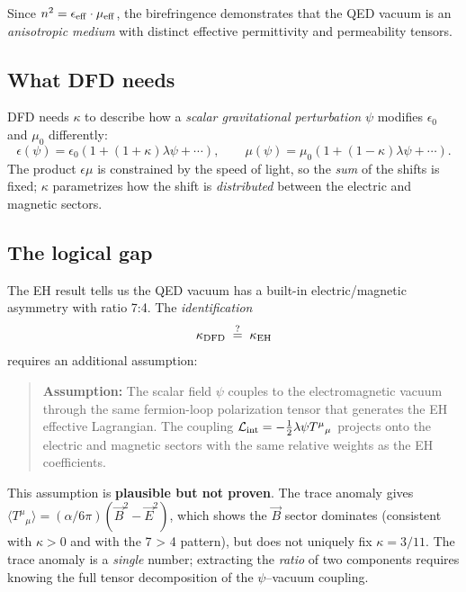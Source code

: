 \documentclass[12pt]{article}
\newcommand{\vE}{\vec{E}}
\newcommand{\vB}{\vec{B}}
\begin{document}
Since $n^2 = \epsilon_{\rm eff} \cdot \mu_{\rm eff}$, the
birefringence demonstrates that the QED vacuum is an
\emph{anisotropic medium} with distinct effective permittivity and
permeability tensors.

\subsection{What DFD needs}

DFD needs $\kappa$ to describe how a \emph{scalar gravitational
perturbation} $\psi$ modifies $\epsilon_0$ and $\mu_0$ differently:
\begin{equation}
\epsilon(\psi) = \epsilon_0(1 + (1+\kappa)\lambda\psi + \cdots),
\qquad
\mu(\psi) = \mu_0(1 + (1-\kappa)\lambda\psi + \cdots).
\end{equation}
The product $\epsilon\mu$ is constrained by the speed of light, so
the \emph{sum} of the shifts is fixed; $\kappa$ parametrizes how the
shift is \emph{distributed} between the electric and magnetic
sectors.

\subsection{The logical gap}

The EH result tells us the QED vacuum has a built-in
electric/magnetic asymmetry with ratio 7:4.  The \emph{identification}
\begin{equation}
\kappa_{\rm DFD} \;\stackrel{?}{=}\; \kappa_{\rm EH}
\label{eq:identification}
\end{equation}
requires an additional assumption:

\begin{quote}
\textbf{Assumption:} The scalar field $\psi$ couples to the
electromagnetic vacuum through the same fermion-loop polarization
tensor that generates the EH effective Lagrangian.  The coupling
$\mathcal{L}_{\rm int} = -\tfrac{1}{2}\lambda\psi T^\mu{}_\mu$
projects onto the electric and magnetic sectors with the same
relative weights as the EH coefficients.
\end{quote}

This assumption is \textbf{plausible but not proven}.  The trace
anomaly gives
$\langle T^\mu{}_\mu\rangle = (\alpha/6\pi)(\vB^2 - \vE^2)$,
which shows the $\vB$ sector dominates (consistent with $\kappa > 0$
and with the 7 > 4 pattern), but does not uniquely fix $\kappa =
3/11$.  The trace anomaly is a \emph{single} number; extracting the
\emph{ratio} of two components requires knowing the full tensor
decomposition of the $\psi$--vacuum coupling.
\end{document}
